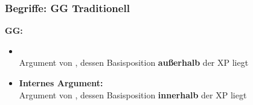 \begin{frame}
\frametitle{Begriffe: GG \vs Traditionell}

\begin{minipage}[b]{0.47\textwidth}

	\textbf{GG:}

	\begin{itemize}
		\item {}\\
		Argument von , dessen Basisposition \textbf{außerhalb} der XP liegt
\medskip
		\item \textbf{Internes Argument:}\\
		Argument von , dessen Basisposition \textbf{innerhalb} der XP liegt
	\end{itemize}	
\end{minipage}  
\begin{minipage}[b]{0.48\textwidth}
	\begin{figure}
	\centering
	\end{figure}
\end{minipage}    

\end{frame}


